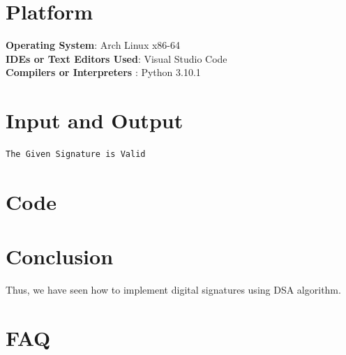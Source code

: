 \documentclass[openany]{book}
\begin{document}
\section{Platform}
\textbf{\textbf{Operating System}}: Arch Linux x86-64 \\
\textbf{\textbf{IDEs or Text Editors Used}}: Visual Studio Code\\
\textbf{\textbf{Compilers or Interpreters} }: Python 3.10.1\\

\section{Input and Output}

\begin{verbatim}
The Given Signature is Valid
\end{verbatim}


\section{Code}


\section{Conclusion}
Thus, we have seen how to implement digital signatures using DSA algorithm.
\clearpage

\section{FAQ}
\end{document}
